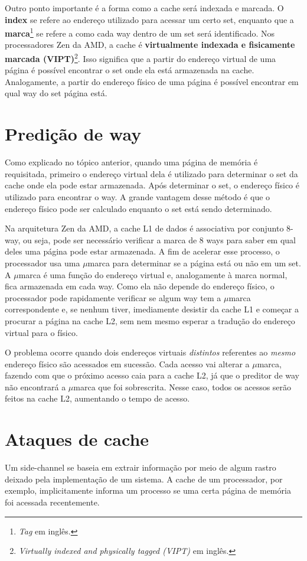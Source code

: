 \documentclass[twocolumn, 12pt]{article}
\begin{document}
Outro ponto importante é a forma
como a cache será indexada e marcada.
O \textbf{index} se refere ao endereço utilizado
para acessar um certo set,
enquanto que a \textbf{marca}\footnote{\textit{Tag} em inglês.}
se refere a como cada way dentro de um set será identificado.
Nos processadores Zen da AMD,
a cache é \textbf{virtualmente indexada e fisicamente marcada (VIPT)}\footnote{\textit{Virtually indexed and physically tagged (VIPT)} em inglês.}\cite{amd}.
Isso significa que a partir do endereço virtual
de uma página é possível encontrar
o set onde ela está armazenada na cache.
Analogamente, a partir do endereço físico de uma página
é possível encontrar em qual way do set página está.

\section{Predição de way}
Como explicado no tópico anterior,
quando uma página de memória é requisitada,
primeiro o endereço virtual dela
é utilizado para determinar o set da cache
onde ela pode estar armazenada.
Após determinar o set,
o endereço físico é
utilizado para encontrar o way.
A grande vantagem desse método
é que o endereço físico pode
ser calculado enquanto
o set está sendo determinado.

Na arquitetura Zen da AMD,
a cache L1 de dados é
associativa por conjunto 8-way\cite{amd},
ou seja, pode ser necessário verificar
a marca de 8 ways para saber
em qual deles uma página
pode estar armazenada.
A fim de acelerar esse processo,
o processador usa uma $\mu$marca
para determinar se a página
está ou não em um set\cite{amd}.
A $\mu$marca é uma função
do endereço virtual e,
analogamente à marca normal,
fica armazenada em cada way.
Como ela não depende do
endereço físico,
o processador pode
rapidamente verificar
se algum way tem a $\mu$marca correspondente e,
se nenhum tiver,
imediamente desistir da cache L1
e começar a procurar a página na cache L2,
sem nem mesmo esperar a tradução
do endereço virtual para o físico.

O problema ocorre quando dois
endereços virtuais \textit{distintos}
referentes ao \textit{mesmo} endereço físico
são acessados em sucessão.
Cada acesso vai alterar a $\mu$marca,
fazendo com que o próximo
acesso caia para a cache L2,
já que o preditor de way
não encontrará a $\mu$marca
que foi sobrescrita\cite{amd}.
Nesse caso,
todos os acessos serão
feitos na cache L2,
aumentando o tempo de acesso.

\section{Ataques de cache}
Um side-channel se baseia em extrair
informação por meio de algum
rastro deixado pela implementação de um sistema.
A cache de um processador, por exemplo,
implicitamente informa um processo
se uma certa página de memória
foi acessada recentemente.
\end{document}
